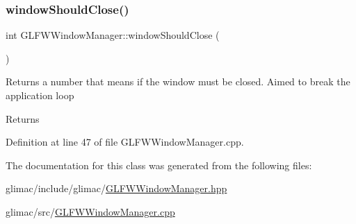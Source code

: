 \subsubsection{\texorpdfstring{window\+Should\+Close()}{windowShouldClose()}}
{\footnotesize\ttfamily int G\+L\+F\+W\+Window\+Manager\+::window\+Should\+Close (\begin{DoxyParamCaption}{ }\end{DoxyParamCaption})}

Returns a number that means if the window must be closed. Aimed to break the application loop \begin{DoxyReturn}{Returns}

\end{DoxyReturn}


Definition at line 47 of file G\+L\+F\+W\+Window\+Manager.\+cpp.



The documentation for this class was generated from the following files\+:\begin{DoxyCompactItemize}
\item 
glimac/include/glimac/\hyperlink{_g_l_f_w_window_manager_8hpp}{G\+L\+F\+W\+Window\+Manager.\+hpp}\item 
glimac/src/\hyperlink{_g_l_f_w_window_manager_8cpp}{G\+L\+F\+W\+Window\+Manager.\+cpp}\end{DoxyCompactItemize}

